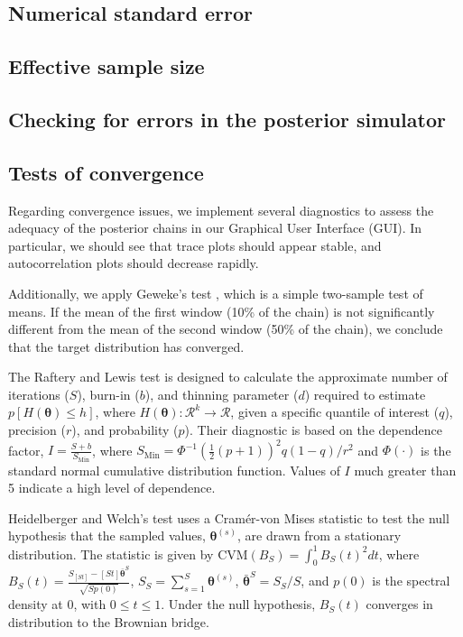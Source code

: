 \subsection{Numerical standard error}
\subsection{Effective sample size}
\subsection{Checking for errors in the posterior simulator}

\cite{geweke2004getting}

\subsection{Tests of convergence}

Regarding convergence issues, we implement several diagnostics to assess the adequacy of the posterior chains \cite{Plummer2016} in our Graphical User Interface (GUI). In particular, we should see that trace plots should appear stable, and autocorrelation plots should decrease rapidly. 

Additionally, we apply Geweke's test \cite{Geweke1992}, which is a simple two-sample test of means. If the mean of the first window (10\% of the chain) is not significantly different from the mean of the second window (50\% of the chain), we conclude that the target distribution has converged.

The Raftery and Lewis test \cite{Raftery1992} is designed to calculate the approximate number of iterations ($S$), burn-in ($b$), and thinning parameter ($d$) required to estimate $p\left[H(\bm{\theta}) \leq h\right]$, where $H(\bm{\theta}): \mathcal{R}^k \rightarrow \mathcal{R}$, given a specific quantile of interest ($q$), precision ($r$), and probability ($p$). Their diagnostic is based on the dependence factor, $I = \frac{S + b}{S_{\text{Min}}}$, where $S_{\text{Min}} = \Phi^{-1}\left(\frac{1}{2}(p+1)\right)^2 q(1-q) / r^2$ and $\Phi(\cdot)$ is the standard normal cumulative distribution function. Values of $I$ much greater than 5 indicate a high level of dependence.

Heidelberger and Welch's test \cite{Heidelberger1983} uses a Cramér-von Mises statistic to test the null hypothesis that the sampled values, $\bm{\theta}^{(s)}$, are drawn from a stationary distribution. The statistic is given by $\text{CVM}(B_S) = \int_0^1 B_S(t)^2 dt$, where $B_S(t) = \frac{S_{\left[St\right]} - \left[St\right] \bar{\bm{\theta}}^S}{\sqrt{S p(0)}}$, $S_S = \sum_{s=1}^S \bm{\theta}^{(s)}$, $\bar{\bm{\theta}}^S = S_S / S$, and $p(0)$ is the spectral density at 0, with $0 \leq t \leq 1$. Under the null hypothesis, $B_S(t)$ converges in distribution to the Brownian bridge. 

